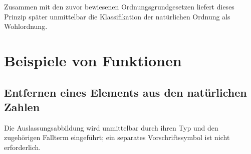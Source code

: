 \documentclass[main.tex]{subfiles}
\begin{document}
\begin{tabproof}
\end{tabproof}

Zusammen mit den zuvor bewiesenen Ordnungsgrundgesetzen liefert dieses
Prinzip später unmittelbar die Klassifikation der natürlichen Ordnung als
Wohlordnung.


\section{Beispiele von Funktionen}



\subsection{Entfernen eines Elements aus den natürlichen Zahlen}

Die Auslassungsabbildung wird unmittelbar durch ihren Typ und den zugehörigen
Fallterm eingeführt; ein separates Vorschriftssymbol ist nicht erforderlich.

\end{document}
